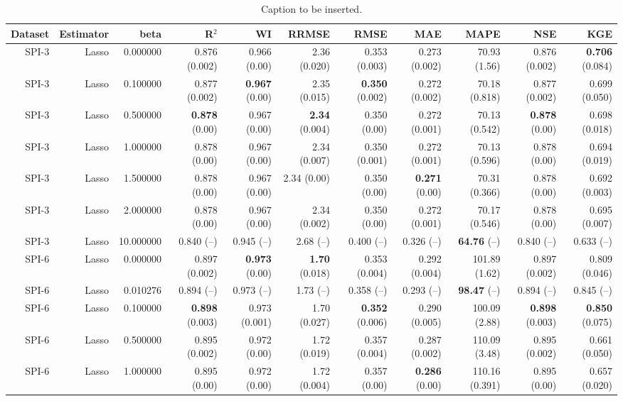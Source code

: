\begin{table}
\caption{Caption to be inserted.}
\label{sp__comparison_datasets_table}
\begin{tabular}{rrrrrrrrrrr}
\toprule
Dataset & Estimator & beta & R$^2$ & WI & RRMSE & RMSE & MAE & MAPE & NSE & KGE \\
\midrule
 SPI-3 & Lasso & 0.000000 & 0.876 (0.002) & 0.966 (0.00) & 2.36 (0.020) & 0.353 (0.003) & 0.273 (0.002) & 70.93 (1.56) & 0.876 (0.002) & { \bf 0.706} (0.084) \\
 SPI-3 & Lasso & 0.100000 & 0.877 (0.002) & { \bf 0.967} (0.00) & 2.35 (0.015) & { \bf 0.350} (0.002) & 0.272 (0.002) & 70.18 (0.818) & 0.877 (0.002) & 0.699 (0.050) \\
 SPI-3 & Lasso & 0.500000 & { \bf 0.878} (0.00) & 0.967 (0.00) & { \bf 2.34} (0.004) & 0.350 (0.00) & 0.272 (0.001) & 70.13 (0.542) & { \bf 0.878} (0.00) & 0.698 (0.018) \\
 SPI-3 & Lasso & 1.000000 & 0.878 (0.00) & 0.967 (0.00) & 2.34 (0.007) & 0.350 (0.001) & 0.272 (0.001) & 70.13 (0.596) & 0.878 (0.00) & 0.694 (0.019) \\
 SPI-3 & Lasso & 1.500000 & 0.878 (0.00) & 0.967 (0.00) & 2.34 (0.00) & 0.350 (0.00) & { \bf 0.271} (0.00) & 70.31 (0.366) & 0.878 (0.00) & 0.692 (0.003) \\
 SPI-3 & Lasso & 2.000000 & 0.878 (0.00) & 0.967 (0.00) & 2.34 (0.002) & 0.350 (0.00) & 0.272 (0.001) & 70.17 (0.546) & 0.878 (0.00) & 0.695 (0.007) \\
 SPI-3 & Lasso & 10.000000 & 0.840 (--) & 0.945 (--) & 2.68 (--) & 0.400 (--) & 0.326 (--) & { \bf 64.76} (--) & 0.840 (--) & 0.633 (--) \\
 SPI-6 & Lasso & 0.000000 & 0.897 (0.002) & { \bf 0.973} (0.00) & { \bf 1.70} (0.018) & 0.353 (0.004) & 0.292 (0.004) & 101.89 (1.62) & 0.897 (0.002) & 0.809 (0.046) \\
 SPI-6 & Lasso & 0.010276 & 0.894 (--) & 0.973 (--) & 1.73 (--) & 0.358 (--) & 0.293 (--) & { \bf 98.47} (--) & 0.894 (--) & 0.845 (--) \\
 SPI-6 & Lasso & 0.100000 & { \bf 0.898} (0.003) & 0.973 (0.001) & 1.70 (0.027) & { \bf 0.352} (0.006) & 0.290 (0.005) & 100.09 (2.88) & { \bf 0.898} (0.003) & { \bf 0.850} (0.075) \\
 SPI-6 & Lasso & 0.500000 & 0.895 (0.002) & 0.972 (0.00) & 1.72 (0.019) & 0.357 (0.004) & 0.287 (0.002) & 110.09 (3.48) & 0.895 (0.002) & 0.661 (0.050) \\
 SPI-6 & Lasso & 1.000000 & 0.895 (0.00) & 0.972 (0.00) & 1.72 (0.004) & 0.357 (0.00) & { \bf 0.286} (0.00) & 110.16 (0.391) & 0.895 (0.00) & 0.657 (0.020) \\

\end{tabular}
\end{table}
